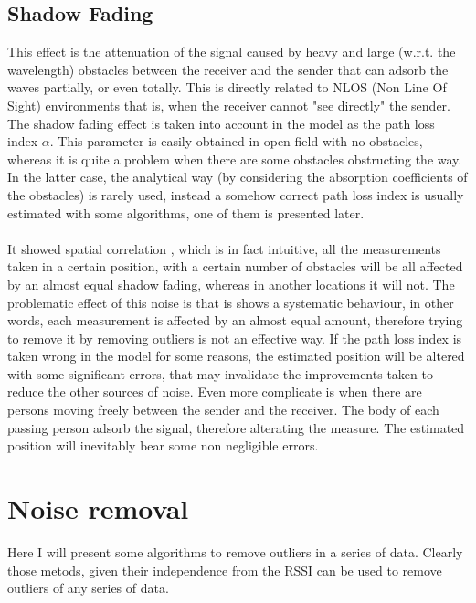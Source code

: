 \documentclass[12pt,twoside]{report}
\begin{document}
\section{Shadow Fading}
This effect is the attenuation of the signal caused by heavy and large (w.r.t. the wavelength) obstacles between the receiver and the sender that can adsorb the waves partially, or even totally. This is directly related to NLOS (Non Line Of Sight) environments that is, when the receiver cannot "see directly" the sender. The shadow fading effect is taken into account in the model as the path loss index $\alpha$. This parameter is easily obtained in open field with no obstacles, whereas it is quite a problem when there are some obstacles obstructing the way. In the latter case, the analytical way (by considering the absorption coefficients of the obstacles) is rarely used, instead a somehow correct path loss index is usually estimated with some algorithms, one of them is presented later.\\\\ 
It showed spatial correlation \cite{244122,732812}, which is in fact intuitive, all the measurements taken in a certain position, with a certain number of obstacles will be all affected by an almost equal shadow fading, whereas in another locations it will not. The problematic effect of this noise is that is shows a systematic behaviour, in other words, each measurement is affected by an almost equal amount, therefore trying to remove it by removing outliers is not an effective way. If the path loss index is taken wrong in the model for some reasons, the estimated position will be altered with some significant errors, that may invalidate the improvements taken to reduce the other sources of noise. Even more complicate is when there are persons moving freely between the sender and the receiver. The body of each passing person adsorb the signal, therefore alterating the measure. The estimated position will inevitably bear some non negligible errors.

\chapter{Noise removal}
Here I will present some algorithms to remove outliers in a series of data. Clearly those metods, given their independence from the RSSI can be used to remove outliers of any series of data.
\end{document}
